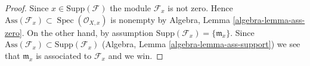\documentclass[10pt,a4paper]{amsart}
\theoremstyle{plain}
\theoremstyle{definition}
\theoremstyle{remark}
\numberwithin{equation}{subsection}
\def\Spec{\mathop{\mathrm{Spec}}}
\begin{document}
\begin{proof}
Since $x \in \text{Supp}(\mathcal{F})$ the module $\mathcal{F}_x$
is not zero. Hence
$\text{Ass}(\mathcal{F}_x) \subset \Spec(\mathcal{O}_{X, x})$
is nonempty by
Algebra, Lemma \ref{algebra-lemma-ass-zero}.
On the other hand, by assumption
$\text{Supp}(\mathcal{F}_x) = \{\mathfrak m_x\}$.
Since
$\text{Ass}(\mathcal{F}_x) \subset \text{Supp}(\mathcal{F}_x)$
(Algebra, Lemma \ref{algebra-lemma-ass-support})
we see that $\mathfrak m_x$ is associated to $\mathcal{F}_x$
and we win.
\end{proof}
\end{document}
